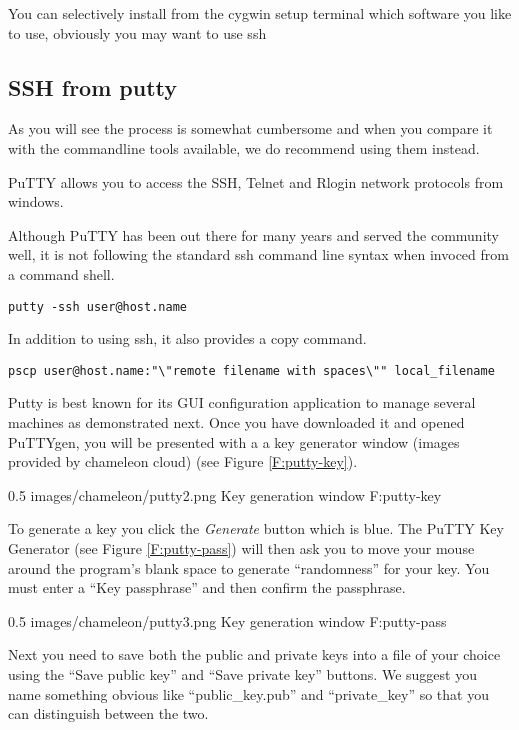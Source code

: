 You can selectively install from the cygwin setup terminal which
software you like to use, obviously you may want to use ssh

\subsection{SSH from putty}\label{S:putty}

As you will see the process is somewhat cumbersome and when you
compare it with the commandline tools available, we do recommend using
them instead.

PuTTY allows you to access the SSH, Telnet and Rlogin network
protocols from windows. 


Although PuTTY has been out there for many years and served the
community well, it is not following the standard ssh command line
syntax when invoced from a command shell.

\begin{verbatim}
putty -ssh user@host.name
\end{verbatim}

In addition to using ssh, it also provides a copy command.

\begin{verbatim}
pscp user@host.name:"\"remote filename with spaces\"" local_filename
\end{verbatim}

Putty is best known for its GUI configuration application to manage
several machines as demonstrated next. Once you have downloaded it and
opened PuTTYgen, you will be presented with a a key generator window
(images provided by chameleon cloud) (see Figure \ref{F:putty-key}).

       {0.5}
       {images/chameleon/putty2.png}
       {Key generation window}
       {F:putty-key} 

To generate a key you click the {\em Generate} button which is
blue. The PuTTY Key Generator (see Figure \ref {F:putty-pass})
will then ask you to move your mouse around the program's blank
space to generate ``randomness'' for your key.  You must enter a
``Key passphrase'' and then confirm the passphrase.

       {0.5}
       {images/chameleon/putty3.png}
       {Key generation window}
       {F:putty-pass} 


Next you need to save both the public and private keys into a file of your choice using
the ``Save public key'' and ``Save private key'' buttons. We suggest
you name something obvious like ``public\_key.pub'' and ``private\_key'' so that you
can distinguish between the two.


